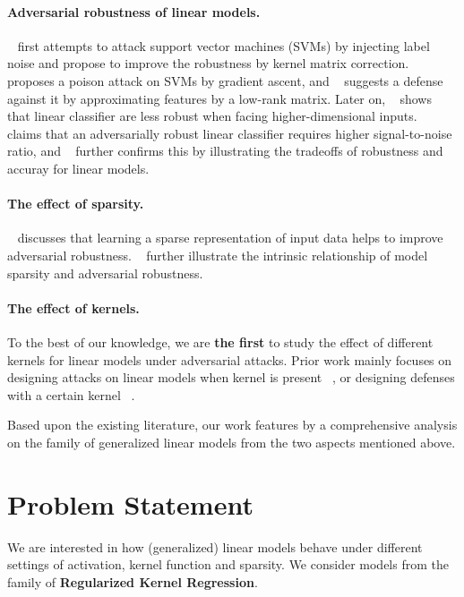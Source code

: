 \documentclass{article}
\begin{document}
\paragraph{Adversarial robustness of linear models.} ~\cite{biggio2011support} first attempts to attack support vector machines (SVMs) by injecting label noise and propose to improve the robustness by kernel matrix correction. ~\cite{bat2012svm} proposes a poison attack on SVMs by gradient ascent, and ~\cite{liu2017robust} suggests a defense against it by approximating features by a low-rank matrix. Later on, ~\cite{megyeri2019adversarial} shows that linear classifier are less robust when facing higher-dimensional inputs. ~\cite{shi2019understanding} claims that an adversarially robust linear classifier requires higher signal-to-noise ratio, and ~\cite{javanmard2020precise} further confirms this by illustrating the tradeoffs of robustness and accuray for linear models.

\paragraph{The effect of sparsity.} ~\cite{gop2018combating} discusses that learning a sparse representation of input data helps to improve adversarial robustness. ~\cite{guo2018sparse, wang2020achieving} further illustrate the intrinsic relationship of model sparsity and adversarial robustness.

\paragraph{The effect of kernels.} To the best of our knowledge, we are \textbf{the first} to study the effect of different kernels for linear models under adversarial attacks. Prior work mainly focuses on designing attacks on linear models when kernel is present ~\cite{biggio2011support}, or designing defenses with a certain kernel ~\cite{hao2019defending, taghanaki2019kernelized}.

Based upon the existing literature, our work features by a comprehensive analysis on the family of generalized linear models from the two aspects mentioned above.



\section{Problem Statement}
We are interested in how (generalized) linear models behave under different settings of activation, kernel function and sparsity. We consider models from the family of \textbf{Regularized Kernel Regression}.
\end{document}
